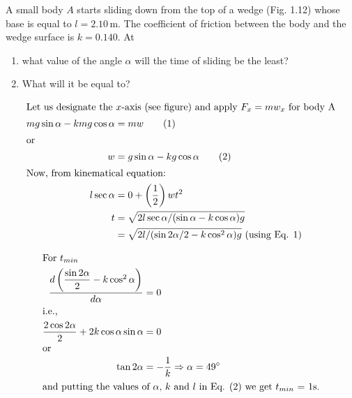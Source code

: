 \item A small body \( A \) starts sliding down from the top of a wedge (Fig. 1.12) whose base is equal to \( l = 2.10 \, \text{m} \). The coefficient of friction between the body and the wedge surface is \( k = 0.140 \). At 
    \begin{center}
    \end{center}
    \begin{enumerate}
        \item what value of the angle \( \alpha \) will the time of sliding be the least?
        \item What will it be equal to?
    \end{enumerate}
\begin{solution}
    \begin{center}
    \end{center}

    \begin{align*}
        \intertext{Let us designate the $x$-axis (see figure) and apply $F_x = mw_x$ for body A}
        mg \sin \alpha - kmg \cos \alpha &= mw \tag{1}\\
        \intertext{or}
        w &= g \sin \alpha - kg \cos \alpha \tag{2}\\
        \intertext{Now, from kinematical equation:}
        l \sec \alpha &= 0 + \left( \dfrac{1}{2} \right) wt^2\\
        t &= \sqrt{2l \sec \alpha /(\sin \alpha - k \cos \alpha)g} \\
        &= \sqrt{2l/(\sin 2\alpha/2 - k \cos^2 \alpha)g} \text{ (using Eq. 1)}
    \end{align*}

    \begin{align*}
        \intertext{For $t_{min}$}
        \dfrac{d \left( \dfrac{\sin 2\alpha}{2} - k \cos^2 \alpha \right)}{d \alpha} &= 0\\
        \intertext{i.e.,}
        \dfrac{2 \cos 2\alpha}{2} + 2k \cos \alpha \sin \alpha &= 0\\
        \intertext{or}
        \tan 2\alpha &= - \dfrac{1}{k} \Rightarrow \alpha = 49^\circ\\
        \intertext{and putting the values of $\alpha$, $k$ and $l$ in Eq. (2) we get $t_{min}$ = 1s.}
    \end{align*}
\end{solution}

